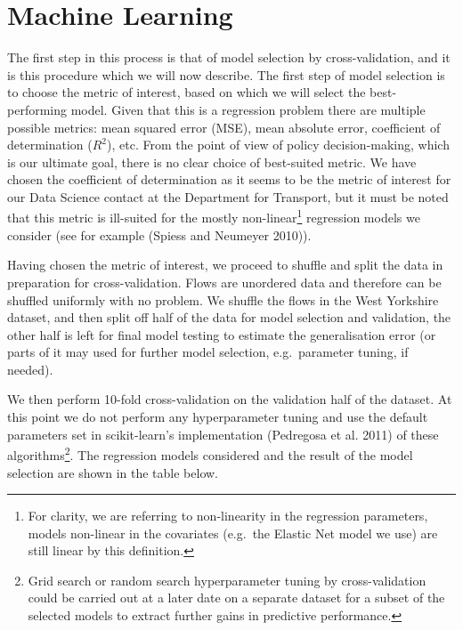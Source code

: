 \documentclass[]{article}
\let\rmarkdownfootnote\footnote%
\def\footnote{\protect\rmarkdownfootnote}
\begin{document}
\section{Machine Learning}\label{machine-learning}

The first step in this process is that of model selection by
cross-validation, and it is this procedure which we will now describe.
The first step of model selection is to choose the metric of interest,
based on which we will select the best-performing model. Given that this
is a regression problem there are multiple possible metrics: mean
squared error (MSE), mean absolute error, coefficient of determination
(\(R^2\)), etc. From the point of view of policy decision-making, which
is our ultimate goal, there is no clear choice of best-suited metric. We
have chosen the coefficient of determination as it seems to be the
metric of interest for our Data Science contact at the Department for
Transport, but it must be noted that this metric is ill-suited for the
mostly non-linear\footnote{For clarity, we are referring to
  non-linearity in the regression parameters, models non-linear in the
  covariates (e.g.~the Elastic Net model we use) are still linear by
  this definition.} regression models we consider (see for example
(Spiess and Neumeyer 2010)).

Having chosen the metric of interest, we proceed to shuffle and split
the data in preparation for cross-validation. Flows are unordered data
and therefore can be shuffled uniformly with no problem. We shuffle the
flows in the West Yorkshire dataset, and then split off half of the data
for model selection and validation, the other half is left for final
model testing to estimate the generalisation error (or parts of it may
used for further model selection, e.g.~parameter tuning, if needed).

We then perform 10-fold cross-validation on the validation half of the
dataset. At this point we do not perform any hyperparameter tuning and
use the default parameters set in scikit-learn's implementation
(Pedregosa et al. 2011) of these algorithms\footnote{Grid search or
  random search hyperparameter tuning by cross-validation could be
  carried out at a later date on a separate dataset for a subset of the
  selected models to extract further gains in predictive performance.}.
The regression models considered and the result of the model selection
are shown in the table below.
\end{document}
